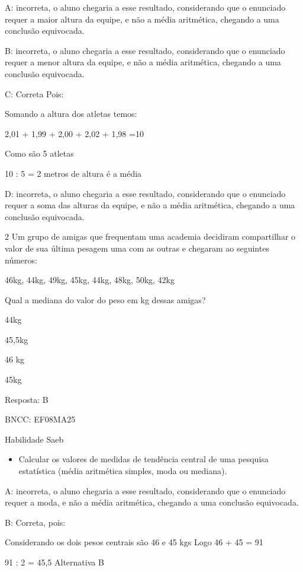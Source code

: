 A: incorreta, o aluno chegaria a esse resultado, considerando que o
enunciado requer a maior altura da equipe, e não a média aritmética,
chegando a uma conclusão equivocada.

B: incorreta, o aluno chegaria a esse resultado, considerando que o
enunciado requer a menor altura da equipe, e não a média aritmética,
chegando a uma conclusão equivocada.

C: Correta Pois:

Somando a altura dos atletas temos:

2,01 + 1,99 + 2,00 + 2,02 + 1,98 =10

Como são 5 atletas

10 : 5 = 2 metros de altura é a média

D: incorreta, o aluno chegaria a esse resultado, considerando que o
enunciado requer a soma das alturas da equipe, e não a média aritmética,
chegando a uma conclusão equivocada.

\num{2} Um grupo de amigas que frequentam uma academia decidiram compartilhar
o valor de sua última pesagem uma com as outras e chegaram ao seguintes
números:

46kg, 44kg, 49kg, 45kg, 44kg, 48kg, 50kg, 42kg

Qual a mediana do valor do peso em kg dessas amigas?

\item 44kg
\item 45,5kg
\item 46 kg
\item 45kg

Resposta: B

BNCC: EF08MA25

Habilidade Saeb

\begin{itemize}
\tightlist

\item 
  Calcular os valores de medidas de tendência central de uma pesquisa
  estatística (média aritmética simples, moda ou mediana).
\end{itemize}

A: incorreta, o aluno chegaria a esse resultado, considerando que o
enunciado requer a moda, e não a média aritmética, chegando a uma
conclusão equivocada.

B: Correta, pois:

Considerando os dois pesos centrais são 46 e 45 kgs Logo 46 + 45 = 91

91 : 2 = 45,5 Alternativa B

